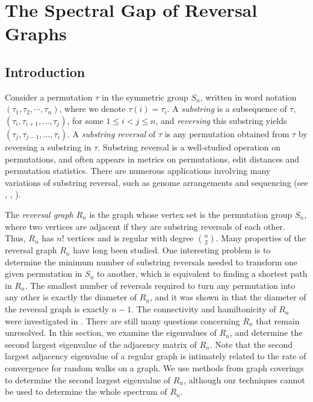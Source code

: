
\chapter{The Spectral Gap of Reversal Graphs}

\section{Introduction}


Consider a permutation $\tau$ in the symmetric group $S_n$, written in 
word notation $(\tau_1, \tau_2, \cdots, \tau_n)$, where we denote $\tau(i) = \tau_i$.  
A \textit{substring} is a subsequence of $\tau$, $(\tau_i, \tau_{i+1}, \ldots, \tau_j)$,
for some $1 \leq i < j\leq n$, and \textit{reversing} this substring yields
$(\tau_j, \tau_{j-1}, \ldots, \tau_i)$.
A \textit{substring reversal} of $\tau$ is any permutation obtained from $\tau$
by reversing a substring in $\tau$. 
Substring reversal is a well-studied operation on permutations, and 
often  appears in metrics on permutations, edit distances
and permutation statistics. There are numerous applications involving many variations of substring reversal,
such as genome arrangements and sequencing  (see \cite{BafnaPevzner1996}, \cite{Hannenhalli1996}, \cite{KececiogluSankoff1995}). 

The \textit{reversal graph} $R_n$ is the graph whose vertex set is the permutation group $S_n$, where
two vertices are adjacent if they are substring reversals of each other. Thus, $R_n$ has $n!$ vertices and is regular
with degree
$\binom {n} 2$.
Many properties of  the reversal graph $R_n$ have long been studied.
One interesting problem is to determine the minimum number of substring reversals needed to transform one
given permutation in $S_n$ to another, which is equivalent to finding 
a shortest path in $R_n$.  The smallest number of reversals required to turn any permutation into any other
is exactly the diameter of $R_n$, and 
it was shown in \cite{BafnaPevzner1996} that the diameter of 
the reversal graph is exactly $n-1$. The connectivity
and hamiltonicity of $R_n$ were investigated in \cite{LiMeng2008}. 
There are  still many questions concerning $R_n$ that remain unresolved. In this section, we examine
 the eigenvalues of  $R_n$, and determine the second largest eigenvalue of the adjacency matrix of $R_n$.
 Note that the second largest adjacency eigenvalue of a regular graph is intimately related to the
 rate of convergence for random walks on a graph. We use methods from graph coverings to determine
 the second largest eigenvalue of $R_n$, although our techniques cannot be used to determine
 the whole spectrum of $R_n$.



